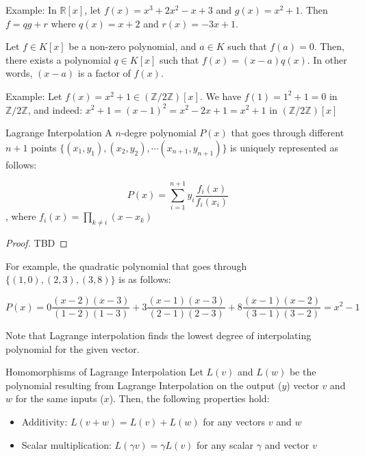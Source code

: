 \documentclass{article}
\begin{document}
Example: In $\mathbb{R}[x]$, let $f(x) = x^3 + 2x^2 - x + 3$ and $g(x) = x^2 + 1$.  Then $f = qg + r$ where $q(x) = x + 2$ and $r(x) = -3x + 1$.

\begin{corollary}{}{}
    Let $f \in K[x]$ be a non-zero polynomial, and $a \in K$ such that $f(a) = 0$. Then, there exists a polynomial $q \in K[x]$ such that $f(x) = (x - a)q(x)$. In other words, $(x - a)$ is a factor of $f(x)$.
\end{corollary}


Example: Let $f(x) = x^2 + 1 \in (\mathbb{Z}/2\mathbb{Z})[x]$. We have $f(1) = 1^2 + 1 = 0$ in $\mathbb{Z}/2\mathbb{Z}$, and indeed: $x^2 + 1 = (x - 1)^2 = x^2 - 2x + 1 = x^2 + 1$ in $(\mathbb{Z}/2\mathbb{Z})[x]$

\begin{theorem}{Lagrange Interpolation}{}
    A $n$-degre polynomial $P(x)$ that goes through different $n + 1$ points $\{(x_1, y_1), (x_2, y_2), \cdots (x_{n + 1}, y_{n + 1})\}$ is uniquely represented as follows:

    \begin{equation}
        P(x) = \sum^{n+1}_{i=1} y_i \frac{f_i(x)}{f_i(x_i)}
    \end{equation}, where $f_i(x) = \prod_{k \neq i} (x - x_k)$
\end{theorem}

\begin{proof}
    TBD
\end{proof}

For example, the quadratic polynomial that goes through $\{(1, 0), (2, 3), (3, 8)\}$ is as follows:

\begin{equation*}
    P(x) = 0 \frac{(x - 2)(x - 3)}{(1 - 2) (1 - 3)} + 3 \frac{(x - 1)(x - 3)}{(2 - 1) (2 - 3)} + 8 \frac{(x - 1)(x - 2)}{(3 - 1) (3 - 2)} = x^{2} - 1
\end{equation*}

Note that Lagrange interpolation finds the lowest degree of interpolating polynomial for the given vector.

\begin{proposition}{Homomorphisms of Lagrange Interpolation}{}
Let $L(v)$ and $L(w)$ be the polynomial resulting from Lagrange Interpolation on the output ($y$) vector $v$ and $w$ for the same inputs ($x$). Then, the following properties hold:

\begin{itemize}
    \item Additivity: $L(v + w) = L(v) + L(w)$ for any vectors $v$ and $w$
    \item Scalar multiplication: $L(\gamma v) = \gamma L(v)$ for any scalar $\gamma$ and vector $v$
\end{itemize}
\end{proposition}
\end{document}
